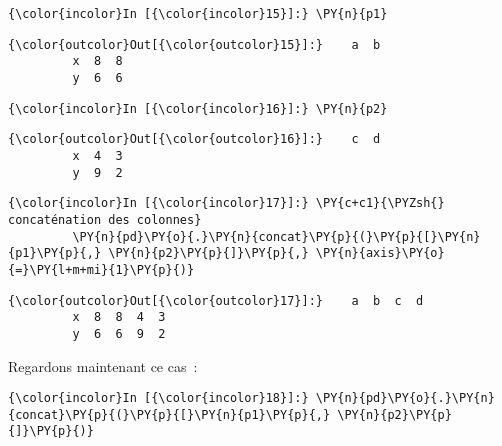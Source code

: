     \begin{Verbatim}[commandchars=\\\{\},frame=single,framerule=0.3mm,rulecolor=\color{cellframecolor}]
{\color{incolor}In [{\color{incolor}15}]:} \PY{n}{p1}
\end{Verbatim}


\begin{Verbatim}[commandchars=\\\{\},frame=single,framerule=0.3mm,rulecolor=\color{cellframecolor}]
{\color{outcolor}Out[{\color{outcolor}15}]:}    a  b
         x  8  8
         y  6  6
\end{Verbatim}
            
    \begin{Verbatim}[commandchars=\\\{\},frame=single,framerule=0.3mm,rulecolor=\color{cellframecolor}]
{\color{incolor}In [{\color{incolor}16}]:} \PY{n}{p2}
\end{Verbatim}


\begin{Verbatim}[commandchars=\\\{\},frame=single,framerule=0.3mm,rulecolor=\color{cellframecolor}]
{\color{outcolor}Out[{\color{outcolor}16}]:}    c  d
         x  4  3
         y  9  2
\end{Verbatim}
            
    \begin{Verbatim}[commandchars=\\\{\},frame=single,framerule=0.3mm,rulecolor=\color{cellframecolor}]
{\color{incolor}In [{\color{incolor}17}]:} \PY{c+c1}{\PYZsh{} concaténation des colonnes}
         \PY{n}{pd}\PY{o}{.}\PY{n}{concat}\PY{p}{(}\PY{p}{[}\PY{n}{p1}\PY{p}{,} \PY{n}{p2}\PY{p}{]}\PY{p}{,} \PY{n}{axis}\PY{o}{=}\PY{l+m+mi}{1}\PY{p}{)}
\end{Verbatim}


\begin{Verbatim}[commandchars=\\\{\},frame=single,framerule=0.3mm,rulecolor=\color{cellframecolor}]
{\color{outcolor}Out[{\color{outcolor}17}]:}    a  b  c  d
         x  8  8  4  3
         y  6  6  9  2
\end{Verbatim}
            
    Regardons maintenant ce cas~:

    \begin{Verbatim}[commandchars=\\\{\},frame=single,framerule=0.3mm,rulecolor=\color{cellframecolor}]
{\color{incolor}In [{\color{incolor}18}]:} \PY{n}{pd}\PY{o}{.}\PY{n}{concat}\PY{p}{(}\PY{p}{[}\PY{n}{p1}\PY{p}{,} \PY{n}{p2}\PY{p}{]}\PY{p}{)}
\end{Verbatim}


